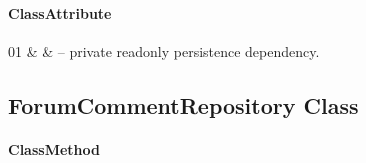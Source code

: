 \paragraph{ClassAttribute}
\begin{ClassAttributeTable}
01 &  &  -- private readonly persistence dependency. \\ \hline
\end{ClassAttributeTable}

\subsection{ForumCommentRepository Class}

\paragraph{ClassMethod}
